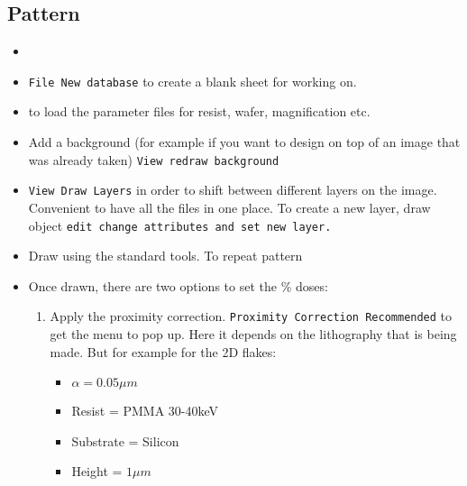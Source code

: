  \subsection{Pattern}
 \begin{itemize}
 	\item {}
 	\item \texttt{File \ra New database} to create a blank sheet for working on.
 	\item {} to load the parameter files for resist, wafer, magnification etc. 
 	\item Add a background (for example if you want to design on top of an image that was already taken) \texttt{View \ra redraw \ra background}
 	\item \texttt{View \ra Draw Layers} in order to shift between different layers on the image. Convenient to have all the files in one place. To create a new layer, draw object \texttt{edit \ra change attributes and set new layer.}
 	\item Draw using the standard tools.  To repeat pattern 
 	\item Once drawn, there are two options to set the \% doses:
 	\begin{enumerate}
 		\item Apply the proximity correction. \texttt{Proximity \ra Correction \ra Recommended} to get the menu to pop up. Here it depends on the lithography that is being made. But for example for the 2D flakes:
 		\begin{itemize}
 			\item $\alpha=0.05\mu m$
 			\item Resist = PMMA 30-40keV
 			\item Substrate = Silicon
 			\item Height = $1\mu m$ 
 		\end{itemize}

\end{enumerate}
\end{itemize}
